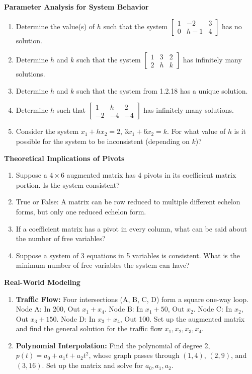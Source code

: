 \documentclass[11pt]{article}
\begin{document}
\textbf{Parameter Analysis for System Behavior}
\begin{enumerate}[label=\textbf{1.2.\arabic*}, resume]
    \item Determine the value(s) of $h$ such that the system $\left[\begin{array}{cc|c} 1 & -2 & 3 \\ 0 & h-1 & 4 \end{array}\right]$ has no solution.
    \item Determine $h$ and $k$ such that the system $\left[\begin{array}{cc|c} 1 & 3 & 2 \\ 2 & h & k \end{array}\right]$ has infinitely many solutions.
    \item Determine $h$ and $k$ such that the system from 1.2.18 has a unique solution.
    \item Determine $h$ such that $\left[\begin{array}{cc|c} 1 & h & 2 \\ -2 & -4 & -4 \end{array}\right]$ has infinitely many solutions.
    \item Consider the system $x_1 + hx_2 = 2$, $3x_1 + 6x_2 = k$. For what value of $h$ is it possible for the system to be inconsistent (depending on $k$)?
\end{enumerate}

\textbf{Theoretical Implications of Pivots}
\begin{enumerate}[label=\textbf{1.2.\arabic*}, resume]
    \item Suppose a $4 \times 6$ augmented matrix has 4 pivots in its coefficient matrix portion. Is the system consistent?
    \item True or False: A matrix can be row reduced to multiple different echelon forms, but only one reduced echelon form.
    \item If a coefficient matrix has a pivot in every column, what can be said about the number of free variables?
    \item Suppose a system of 3 equations in 5 variables is consistent. What is the minimum number of free variables the system can have?
\end{enumerate}

\textbf{Real-World Modeling}
\begin{enumerate}[label=\textbf{1.2.\arabic*}, resume]
    \item \textbf{Traffic Flow:} Four intersections (A, B, C, D) form a square one-way loop. 
    Node A: In 200, Out $x_1 + x_4$.
    Node B: In $x_1 + 50$, Out $x_2$.
    Node C: In $x_2$, Out $x_3 + 150$.
    Node D: In $x_3 + x_4$, Out 100.
    Set up the augmented matrix and find the general solution for the traffic flow $x_1, x_2, x_3, x_4$.
    \item \textbf{Polynomial Interpolation:} Find the polynomial of degree 2, $p(t) = a_0 + a_1 t + a_2 t^2$, whose graph passes through $(1, 4)$, $(2, 9)$, and $(3, 16)$. Set up the matrix and solve for $a_0, a_1, a_2$.
\end{enumerate}
\end{document}
